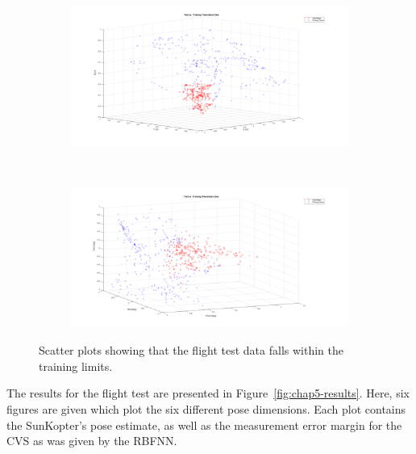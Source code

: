 \begin{figure}
  \centering
  \begin{subfigure}{0.9\textwidth}
    \includegraphics[width=\textwidth]{figures/chapter5/ts_v_tr_pos}
    \caption{}
  \end{subfigure}
  ~
  \begin{subfigure}{0.9\textwidth}
    \includegraphics[width=\textwidth]{figures/chapter5/ts_v_tr_orient}
    \caption{}
  \end{subfigure}
  \caption[Scatter plots of flight data vs. training data. ]{Scatter plots showing that the flight test data falls within the training limits. }
  \label{fig:chap5-ts-tr-scatter}
\end{figure}

The results for the flight test are presented in Figure~\ref{fig:chap5-results}. Here, six figures are given which plot the six different pose dimensions. Each plot contains the SunKopter's pose estimate, as well as the measurement error margin for the CVS as was given by the RBFNN. 
  
